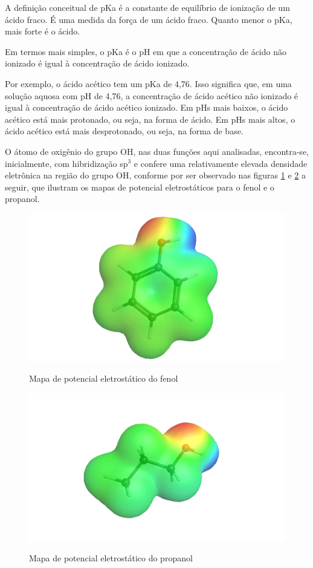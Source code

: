 A definição conceitual de pKa é a constante de equilíbrio de ionização de um ácido fraco. É uma medida da força de um ácido fraco. Quanto menor o pKa, mais forte é o ácido.

Em termos mais simples, o pKa é o pH em que a concentração de ácido não ionizado é igual à concentração de ácido ionizado.

Por exemplo, o ácido acético tem um pKa de 4,76. Isso significa que, em uma solução aquosa com pH de 4,76, a concentração de ácido acético não ionizado é igual à concentração de ácido acético ionizado. Em pHs mais baixos, o ácido acético está mais protonado, ou seja, na forma de ácido. Em pHs mais altos, o ácido acético está mais desprotonado, ou seja, na forma de base.

O átomo de oxigênio do grupo OH, nas duas funções aqui analisadas, encontra-se, inicialmente, com hibridização sp{$^3$} e confere uma relativamente elevada densidade eletrônica na região do grupo OH, conforme por ser observado nas figuras \ref{fig:fenol} e \ref{fig:propanol} a seguir, que ilustram os mapas de potencial eletrostáticos para o fenol e o propanol.

\begin{figure}[h]
    \centering
    \caption{Mapa de potencial eletrostático do fenol}
    \vspace{0.5cm}
    \includegraphics[width=0.6\linewidth]{imagens/fenol.png}
\label{fig:fenol}
\end{figure}

\begin{figure}[h]
    \centering
    \caption{Mapa de potencial eletrostático do propanol}
    \vspace{0.5cm}
    \includegraphics[width=0.75\linewidth]{imagens/propanol.png}
\label{fig:propanol}
\end{figure}

